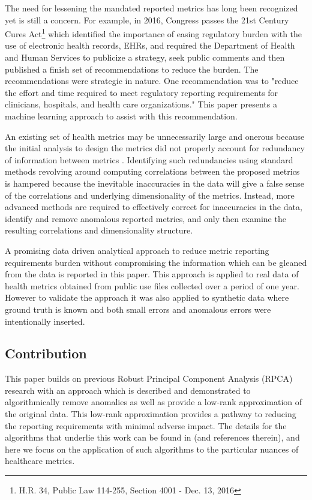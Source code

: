 \documentclass[conference]{IEEEtran}
\begin{document}
The need for lessening the mandated reported metrics has long been recognized yet is still a concern.  For example, in 2016, Congress passes the  21st Century Cures Act\footnote{H.R. 34, Public Law 114-255, Section 4001 - Dec. 13, 2016} which identified the importance of easing regulatory burden with the use of electronic health records, EHRs, and required  the Department of Health and Human Services to publicize a strategy, seek public comments and then published a finish set of recommendations to reduce the burden. \cite{HHS2019str} The recommendations were strategic in nature. One recommendation was to "reduce the effort and time required to meet regulatory reporting requirements for clinicians, hospitals, and health care organizations."  This paper presents a machine learning approach to assist with this recommendation. 


An existing set of health metrics may be unnecessarily large and onerous because the initial analysis to design the metrics did not properly account for redundancy of information between metrics \cite{lesidea1, vostok2013assessment}.
Identifying such redundancies using standard methods revolving around computing correlations between the proposed metrics is hampered because the inevitable inaccuracies in the data will give a false sense of the correlations and underlying dimensionality of the metrics.   Instead, more advanced methods are required to effectively correct for  inaccuracies in the data, identify and remove anomalous reported metrics, and only then examine the resulting correlations and dimensionality structure.

A promising data driven analytical approach to reduce metric reporting requirements burden without compromising the information which can be gleaned from the data is reported in this paper. This approach is applied to real data of  health metrics obtained from public use files collected over a period of one year.  However to validate the approach it was also applied to synthetic data where ground truth is known and both small errors and anomalous errors were intentionally inserted.


\subsection{Contribution}
This paper builds on previous Robust Principal Component Analysis (RPCA) research with an approach which is described and demonstrated to algorithmically remove anomalies as well as provide a low-rank approximation of the original data.  This low-rank approximation provides a pathway to reducing the reporting requirements with minimal adverse impact.  The details for the algorithms that underlie this work can be found in \cite{paffenroth2018robust,Paffenroth2012} (and references therein), and here we focus on the application of such algorithms to the particular nuances of healthcare metrics. 
\end{document}
